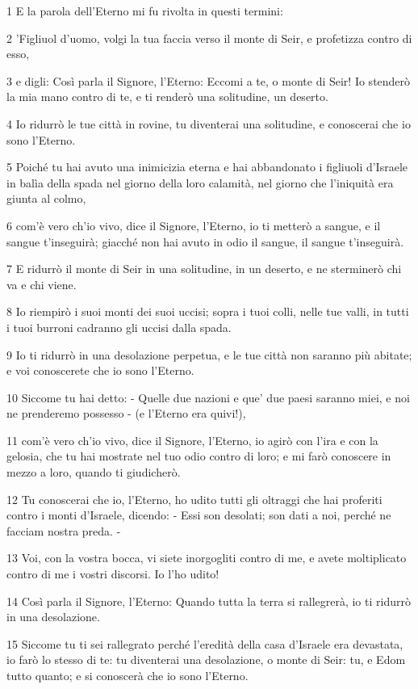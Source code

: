 \par 1 E la parola dell'Eterno mi fu rivolta in questi termini:
\par 2 'Figliuol d'uomo, volgi la tua faccia verso il monte di Seir, e profetizza contro di esso,
\par 3 e digli: Così parla il Signore, l'Eterno: Eccomi a te, o monte di Seir! Io stenderò la mia mano contro di te, e ti renderò una solitudine, un deserto.
\par 4 Io ridurrò le tue città in rovine, tu diventerai una solitudine, e conoscerai che io sono l'Eterno.
\par 5 Poiché tu hai avuto una inimicizia eterna e hai abbandonato i figliuoli d'Israele in balìa della spada nel giorno della loro calamità, nel giorno che l'iniquità era giunta al colmo,
\par 6 com'è vero ch'io vivo, dice il Signore, l'Eterno, io ti metterò a sangue, e il sangue t'inseguirà; giacché non hai avuto in odio il sangue, il sangue t'inseguirà.
\par 7 E ridurrò il monte di Seir in una solitudine, in un deserto, e ne sterminerò chi va e chi viene.
\par 8 Io riempirò i suoi monti dei suoi uccisi; sopra i tuoi colli, nelle tue valli, in tutti i tuoi burroni cadranno gli uccisi dalla spada.
\par 9 Io ti ridurrò in una desolazione perpetua, e le tue città non saranno più abitate; e voi conoscerete che io sono l'Eterno.
\par 10 Siccome tu hai detto: - Quelle due nazioni e que' due paesi saranno miei, e noi ne prenderemo possesso - (e l'Eterno era quivi!),
\par 11 com'è vero ch'io vivo, dice il Signore, l'Eterno, io agirò con l'ira e con la gelosia, che tu hai mostrate nel tuo odio contro di loro; e mi farò conoscere in mezzo a loro, quando ti giudicherò.
\par 12 Tu conoscerai che io, l'Eterno, ho udito tutti gli oltraggi che hai proferiti contro i monti d'Israele, dicendo: - Essi son desolati; son dati a noi, perché ne facciam nostra preda. -
\par 13 Voi, con la vostra bocca, vi siete inorgogliti contro di me, e avete moltiplicato contro di me i vostri discorsi. Io l'ho udito!
\par 14 Così parla il Signore, l'Eterno: Quando tutta la terra si rallegrerà, io ti ridurrò in una desolazione.
\par 15 Siccome tu ti sei rallegrato perché l'eredità della casa d'Israele era devastata, io farò lo stesso di te: tu diventerai una desolazione, o monte di Seir: tu, e Edom tutto quanto; e si conoscerà che io sono l'Eterno.

